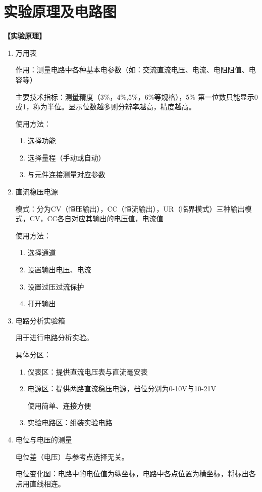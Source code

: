 \documentclass[a4paper]{article}
\begin{document}
\section{实验原理及电路图}
\begin{flushleft}
    \bfseries{}\songti 【实验原理】
\end{flushleft}
\begin{enumerate}
    \item 万用表\par 作用：测量电路中各种基本电参数（如：交流直流电压、电流、电阻阻值、电容等）\par 主要技术指标：测量精度（3\%，4\%,5\%，6\%等规格），5\% 第一位数只能显示0或1，称为半位。显示位数越多则分辨率越高，精度越高。\par 使用方法：\par
        \begin{enumerate}
            \item 选择功能
            \item 选择量程（手动或自动）
            \item 与元件连接测量对应参数
        \end{enumerate}
    \item 直流稳压电源\par 模式：分为CV（恒压输出），CC（恒流输出），UR（临界模式）三种输出模式，CV，CC各自对应其输出的电压值，电流值 \par 使用方法：\par
        \begin{enumerate}
            \item 选择通道
            \item 设置输出电压、电流
            \item 设置过压过流保护
            \item 打开输出
        \end{enumerate}
    \item 电路分析实验箱\par 用于进行电路分析实验。\par 具体分区：\par
        \begin{enumerate}
            \item 仪表区：提供直流电压表与直流毫安表
            \item 电源区：提供两路直流稳压电源，档位分别为0-10V与10-21V\par 使用简单、连接方便
            \item 实验电路区：组装实验电路
        \end{enumerate}
    \item 电位与电压的测量\par 电位差（电压）与参考点选择无关。\par 电位变化图：电路中的电位值为纵坐标，电路中各点位置为横坐标，将标出各点用直线相连。
\end{enumerate}
\end{document}
